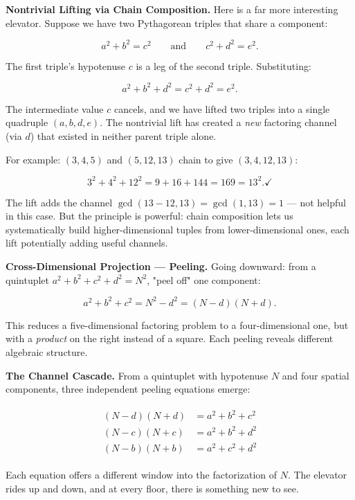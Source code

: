 \documentclass[11pt,twoside,openright]{book}
\theoremstyle{definition}
\theoremstyle{remark}
\begin{document}
\textbf{Nontrivial Lifting via Chain Composition.} Here is a far more interesting elevator. Suppose we have two Pythagorean triples that share a component:

\[a^2 + b^2 = c^2 \qquad \text{and} \qquad c^2 + d^2 = e^2.\]

The first triple's hypotenuse $c$ is a leg of the second triple. Substituting:

\[a^2 + b^2 + d^2 = c^2 + d^2 = e^2.\]

The intermediate value $c$ cancels, and we have lifted two triples into a single quadruple $(a, b, d, e)$. The nontrivial lift has created a \textit{new} factoring channel (via $d$) that existed in neither parent triple alone.

For example: $(3, 4, 5)$ and $(5, 12, 13)$ chain to give $(3, 4, 12, 13)$:

\[3^2 + 4^2 + 12^2 = 9 + 16 + 144 = 169 = 13^2. \checkmark\]

The lift adds the channel $\gcd(13 - 12, 13) = \gcd(1, 13) = 1$ --- not helpful in this case. But the principle is powerful: chain composition lets us systematically build higher-dimensional tuples from lower-dimensional ones, each lift potentially adding useful channels.

\textbf{Cross-Dimensional Projection --- Peeling.} Going downward: from a quintuplet $a^2 + b^2 + c^2 + d^2 = N^2$, "peel off" one component:

\[a^2 + b^2 + c^2 = N^2 - d^2 = (N - d)(N + d).\]

This reduces a five-dimensional factoring problem to a four-dimensional one, but with a \textit{product} on the right instead of a square. Each peeling reveals different algebraic structure.

\textbf{The Channel Cascade.} From a quintuplet with hypotenuse $N$ and four spatial components, three independent peeling equations emerge:

\begin{align*}
\begin{aligned}
(N - d)(N + d) &= a^2 + b^2 + c^2 \\
(N - c)(N + c) &= a^2 + b^2 + d^2 \\
(N - b)(N + b) &= a^2 + c^2 + d^2
\end{aligned}
\end{align*}

Each equation offers a different window into the factorization of $N$. The elevator rides up and down, and at every floor, there is something new to see.
\end{document}
